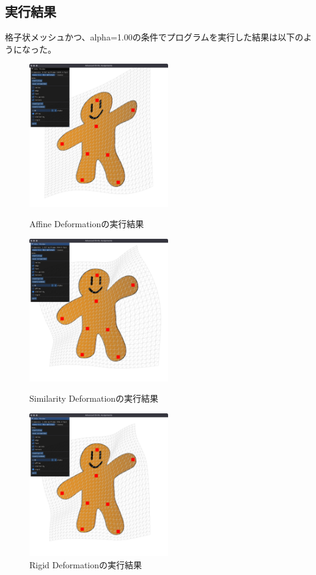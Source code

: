 \documentclass[a4paper,10pt,uplatex,dvipdfmx]{jsarticle}
\begin{document}
\subsection{実行結果}
格子状メッシュかつ、alpha=1.00の条件でプログラムを実行した結果は以下のようになった。
\begin{figure}[H]
  \centering
  \includegraphics[width=6cm]{./img/affine.png}
  \caption{Affine Deformationの実行結果}

  \vspace{5mm}

  \centering
  \includegraphics[width=6cm]{./img/similarity.png}
  \caption{Similarity Deformationの実行結果}

  \vspace{5mm}

  \centering
  \includegraphics[width=6cm]{./img/rigid.png}
  \caption{Rigid Deformationの実行結果}
\end{figure}
\end{document}
